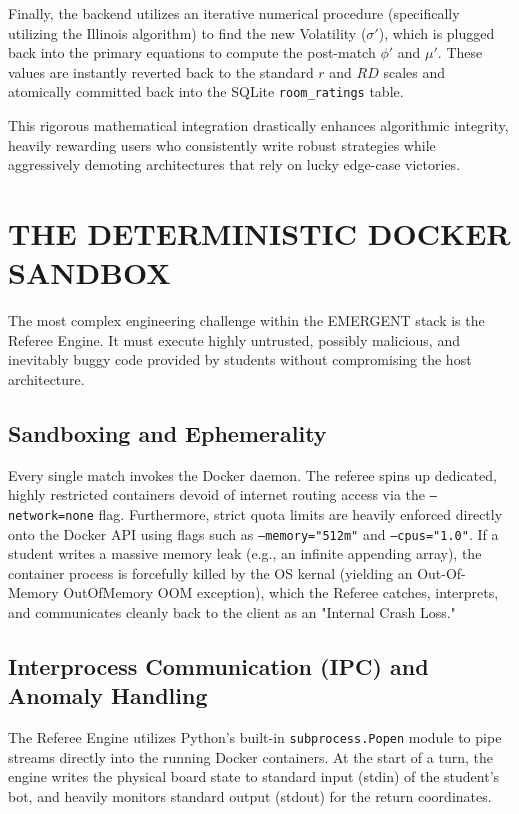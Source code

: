 \documentclass[12pt,a4paper]{report}
\begin{document}
Finally, the backend utilizes an iterative numerical procedure (specifically utilizing the Illinois algorithm) to find the new Volatility ($\sigma'$), which is plugged back into the primary equations to compute the post-match $\phi'$ and $\mu'$. These values are instantly reverted back to the standard $r$ and $RD$ scales and atomically committed back into the SQLite \texttt{room\_ratings} table. 

This rigorous mathematical integration drastically enhances algorithmic integrity, heavily rewarding users who consistently write robust strategies while aggressively demoting architectures that rely on lucky edge-case victories.

\section{THE DETERMINISTIC DOCKER SANDBOX}
The most complex engineering challenge within the EMERGENT stack is the Referee Engine. It must execute highly untrusted, possibly malicious, and inevitably buggy code provided by students without compromising the host architecture.

\subsection{Sandboxing and Ephemerality}
Every single match invokes the Docker daemon. The referee spins up dedicated, highly restricted containers devoid of internet routing access via the \texttt{--network=none} flag. Furthermore, strict quota limits are heavily enforced directly onto the Docker API using flags such as \texttt{--memory="512m"} and \texttt{--cpus="1.0"}. If a student writes a massive memory leak (e.g., an infinite appending array), the container process is forcefully killed by the OS kernal (yielding an Out-Of-Memory OutOfMemory OOM exception), which the Referee catches, interprets, and communicates cleanly back to the client as an "Internal Crash Loss."

\subsection{Interprocess Communication (IPC) and Anomaly Handling}
The Referee Engine utilizes Python's built-in \texttt{subprocess.Popen} module to pipe streams directly into the running Docker containers. At the start of a turn, the engine writes the physical board state to standard input (stdin) of the student's bot, and heavily monitors standard output (stdout) for the return coordinates.
\end{document}
